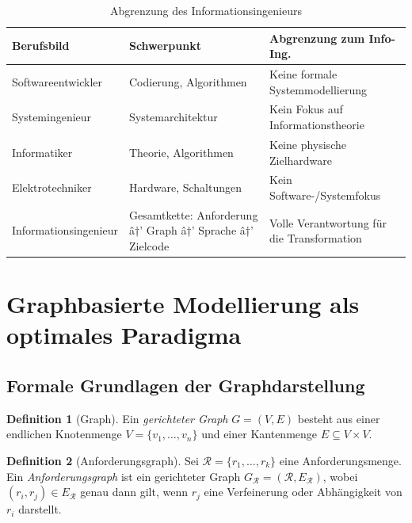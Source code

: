 ﻿\documentclass[a4paper,12pt]{article}
\theoremstyle{definition}
\newtheorem{definition}{Definition}
\begin{document}
\begin{table}[h]
\centering
\caption{Abgrenzung des Informationsingenieurs}
\begin{tabular}{@{}lp{4.5cm}p{4.5cm}@{}}
\toprule
\textbf{Berufsbild} & \textbf{Schwerpunkt} & \textbf{Abgrenzung zum Info-Ing.} \\
\midrule
Softwareentwickler & Codierung, Algorithmen & Keine formale Systemmodellierung \\
Systemingenieur    & Systemarchitektur      & Kein Fokus auf Informationstheorie \\
Informatiker       & Theorie, Algorithmen   & Keine physische Zielhardware \\
Elektrotechniker   & Hardware, Schaltungen  & Kein Software-/Systemfokus \\
Informationsingenieur & Gesamtkette: Anforderung â†’ Graph â†’ Sprache â†’ Zielcode & Volle Verantwortung für die Transformation \\
\bottomrule
\end{tabular}
\end{table}

\section{Graphbasierte Modellierung als optimales Paradigma}
\label{sec:graphmodell}

\subsection{Formale Grundlagen der Graphdarstellung}

\begin{definition}[Graph]
Ein \emph{gerichteter Graph} $G = (V, E)$ besteht aus einer endlichen Knotenmenge
$V = \{v_1, \ldots, v_n\}$ und einer Kantenmenge
$E \subseteq V \times V$.
\end{definition}

\begin{definition}[Anforderungsgraph]
\label{def:anfgraph}
Sei $\mathcal{R} = \{r_1, \ldots, r_k\}$ eine Anforderungsmenge. Ein
\emph{Anforderungsgraph} ist ein gerichteter Graph
$G_{\mathcal{R}} = (\mathcal{R}, E_{\mathcal{R}})$, wobei
$(r_i, r_j) \in E_{\mathcal{R}}$ genau dann gilt, wenn $r_j$ eine Verfeinerung oder
Abhängigkeit von $r_i$ darstellt.
\end{definition}
\end{document}
